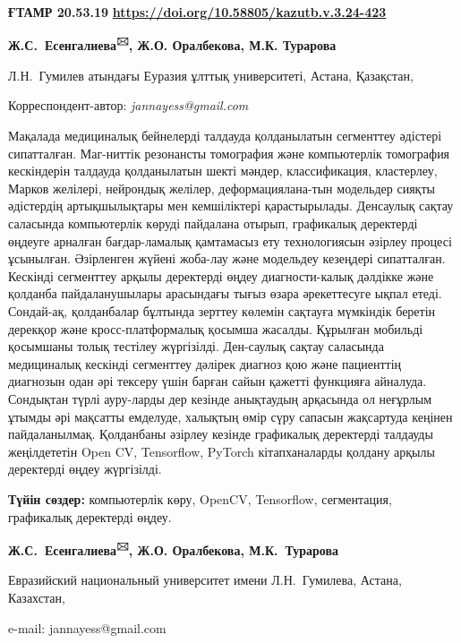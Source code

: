 \newpage
{\bfseries ҒТАМР 20.53.19}
\hfill {\bfseries \href{https://doi.org/10.58805/kazutb.v.3.24-423}{https://doi.org/10.58805/kazutb.v.3.24-423}}


\begin{center}
 
{\bfseries Ж.С.~Есенгалиева\textsuperscript{🖂}, Ж.О. Оралбекова, М.К.
Турарова}

Л.Н.~Гумилев атындағы Еуразия ұлттық университеті, Астана, Қазақстан,
\end{center}
Корреспондент-автор: \emph{jannayess@gmail.com} \vspace{0.5cm}

Мақалада медициналық бейнелерді талдауда қолданылатын сегменттеу
әдістері сипатталған. Маг-ниттік резонансты томография және компьютерлік
томография кескіндерін талдауда қолданылатын шекті мәндер,
классификация, кластерлеу, Марков желілері, нейрондық желілер,
деформациялана-тын модельдер сияқты әдістердің артықшылықтары мен
кемшіліктері қарастырылады. Денсаулық сақтау саласында компьютерлік
көруді пайдалана отырып, графикалық деректерді өңдеуге арналған
бағдар-ламалық қамтамасыз ету технологиясын әзірлеу процесі ұсынылған.
Әзірленген жүйені жоба-лау және модельдеу кезеңдері сипатталған. Кескінді
сегменттеу арқылы деректерді өңдеу диагности-калық дәлдікке және қолданба
пайдаланушылары арасындағы тығыз өзара әрекеттесуге ықпал етеді.
Сондай-ақ, қолданбалар бұлтында зерттеу көлемін сақтауға мүмкіндік
беретін дерекқор және кросс-платформалық қосымша жасалды. Құрылған
мобильді қосымшаны толық тестілеу жүргізілді. Ден-саулық сақтау саласында
медициналық кескінді сегменттеу дәлірек диагноз қою және пациенттің
диагнозын одан әрі тексеру үшін барған сайын қажетті функцияға айналуда.
Сондықтан түрлі ауру-ларды дер кезінде анықтаудың арқасында ол неғұрлым
ұтымды әрі мақсатты емделуде, халықтың өмір сүру сапасын жақсартуда
кеңінен пайдаланылмақ. Қолданбаны әзірлеу кезінде графикалық деректерді
талдауды жеңілдететін Open CV, Tensorflow, PyTorch кітапханаларды
қолдану арқылы деректерді өңдеу жүргізілді.

{\bfseries Түйін сөздер:} компьютерлік көру, OpenCV, Tensorflow,
сегментация, графикалық деректерді өңдеу.


\begin{center}


{\bfseries Ж.С.~Есенгалиева\textsuperscript{🖂}, Ж.О. Оралбекова,
М.К.~Турарова}

Евразийский национальный университет имени Л.Н.~Гумилева, Астана,
Казахстан,

e-mail: jannayess@gmail.com
\end{center}

